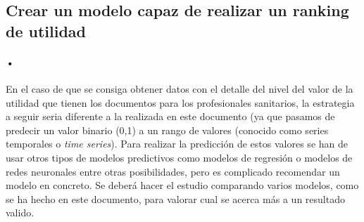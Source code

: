 \subsection{Crear un modelo capaz de realizar un ranking de utilidad}
\paragraph{•} En el caso de que se consiga obtener datos con el detalle del nivel del valor de la utilidad que tienen los documentos para los profesionales sanitarios, la estrategia a seguir seria diferente a la realizada en este documento (ya que pasamos de predecir un valor binario (0,1) a un rango de valores (conocido como series temporales o \textit{time series}). Para realizar la predicción de estos valores se han de usar otros tipos de modelos predictivos como modelos de regresión o modelos de redes neuronales entre otras posibilidades, pero es complicado recomendar un modelo en concreto. Se deberá hacer el estudio comparando varios modelos, como se ha hecho en este documento, para valorar cual se acerca más a un resultado valido.